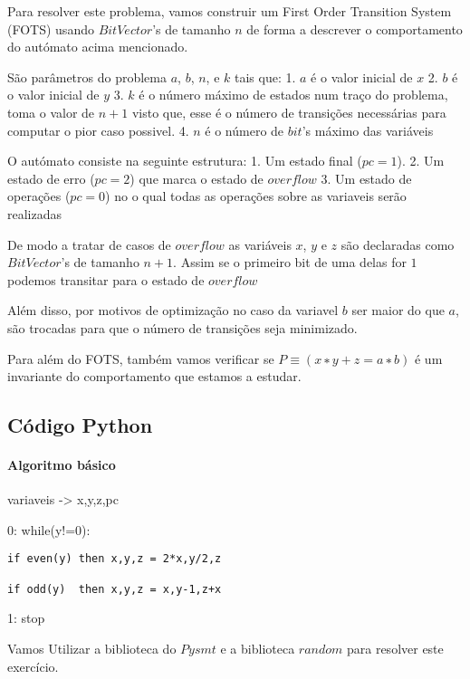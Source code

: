 \documentclass[11pt]{article}
\begin{document}
    Para resolver este problema, vamos construir um First Order Transition
System (FOTS) usando \(BitVector\)'s de tamanho \(n\) de forma a
descrever o comportamento do autómato acima mencionado.

São parâmetros do problema \(a\), \(b\), \(n\), e \(k\) tais que: 1.
\(a\) é o valor inicial de \(x\) 2. \(b\) é o valor inicial de \(y\) 3.
\(k\) é o número máximo de estados num traço do problema, toma o valor
de \(n+1\) visto que, esse é o número de transições necessárias para
computar o pior caso possivel. 4. \(n\) é o número de \(bit\)'s máximo
das variáveis

O autómato consiste na seguinte estrutura: 1. Um estado final
(\(pc=1\)). 2. Um estado de erro (\(pc=2\)) que marca o estado de
\(overflow\) 3. Um estado de operações (\(pc=0\)) no o qual todas as
operações sobre as variaveis serão realizadas

De modo a tratar de casos de \(overflow\) as variáveis \(x\), \(y\) e
\(z\) são declaradas como \(BitVector\)'s de tamanho \(n+1\). Assim se o
primeiro bit de uma delas for \(1\) podemos transitar para o estado de
\(overflow\)

Além disso, por motivos de optimização no caso da variavel \(b\) ser
maior do que \(a\), são trocadas para que o número de transições seja
minimizado.

Para além do FOTS, também vamos verificar se \(P≡(x∗y+z=a∗b)\) é um
invariante do comportamento que estamos a estudar.

    \hypertarget{cuxf3digo-python}{%
\subsection{Código Python}\label{cuxf3digo-python}}

    \hypertarget{algoritmo-buxe1sico}{%
\paragraph{Algoritmo básico}\label{algoritmo-buxe1sico}}

    variaveis -\textgreater{} x,y,z,pc

0: while(y!=0):

\begin{verbatim}
if even(y) then x,y,z = 2*x,y/2,z

if odd(y)  then x,y,z = x,y-1,z+x
\end{verbatim}

1: stop

    Vamos Utilizar a biblioteca do \(\textit{Pysmt}\) e a biblioteca
\(\textit{random}\) para resolver este exercício.
\end{document}
